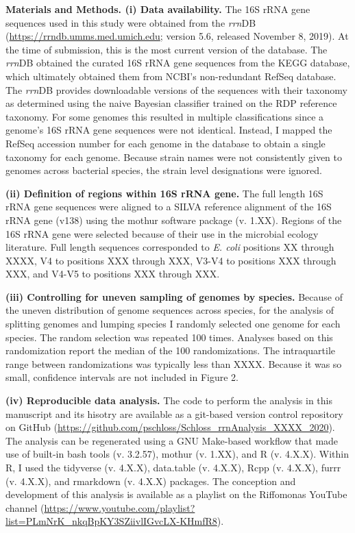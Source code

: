\documentclass[
]{article}
\begin{document}
\textbf{Materials and Methods. (i) Data availability.} The 16S rRNA gene
sequences used in this study were obtained from the \emph{rrn}DB
(\url{https://rrndb.umms.med.umich.edu}; version 5.6, released November
8, 2019). At the time of submission, this is the most current version of
the database. The \emph{rrn}DB obtained the curated 16S rRNA gene
sequences from the KEGG database, which ultimately obtained them from
NCBI's non-redundant RefSeq database. The \emph{rrn}DB provides
downloadable versions of the sequences with their taxonomy as determined
using the naive Bayesian classifier trained on the RDP reference
taxonomy. For some genomes this resulted in multiple classifications
since a genome's 16S rRNA gene sequences were not identical. Instead, I
mapped the RefSeq accession number for each genome in the database to
obtain a single taxonomy for each genome. Because strain names were not
consistently given to genomes across bacterial species, the strain level
designations were ignored.

\textbf{(ii) Definition of regions within 16S rRNA gene.} The full
length 16S rRNA gene sequences were aligned to a SILVA reference
alignment of the 16S rRNA gene (v138) using the mothur software package
(v. 1.XX). Regions of the 16S rRNA gene were selected because of their
use in the microbial ecology literature. Full length sequences
corresponded to \emph{E. coli} positions XX through XXXX, V4 to
positions XXX through XXX, V3-V4 to positions XXX through XXX, and V4-V5
to positions XXX through XXX.

\textbf{(iii) Controlling for uneven sampling of genomes by species.}
Because of the uneven distribution of genome sequences across species,
for the analysis of splitting genomes and lumping species I randomly
selected one genome for each species. The random selection was repeated
100 times. Analyses based on this randomization report the median of the
100 randomizations. The intraquartile range between randomizations was
typically less than XXXX. Because it was so small, confidence intervals
are not included in Figure 2.

\textbf{(iv) Reproducible data analysis.} The code to perform the
analysis in this manuscript and its hisotry are available as a git-based
version control repository on GitHub
(\url{https://github.com/pschloss/Schloss_rrnAnalysis_XXXX_2020}). The
analysis can be regenerated using a GNU Make-based workflow that made
use of built-in bash tools (v. 3.2.57), mothur (v. 1.XX), and R (v.
4.X.X). Within R, I used the tidyverse (v. 4.X.X), data.table (v.
4.X.X), Rcpp (v. 4.X.X), furrr (v. 4.X.X), and rmarkdown (v. 4.X.X)
packages. The conception and development of this analysis is available
as a playlist on the Riffomonas YouTube channel
(\url{https://www.youtube.com/playlist?list=PLmNrK_nkqBpKY3SZiivlIGvcLX-KHmfR8}).
\end{document}
